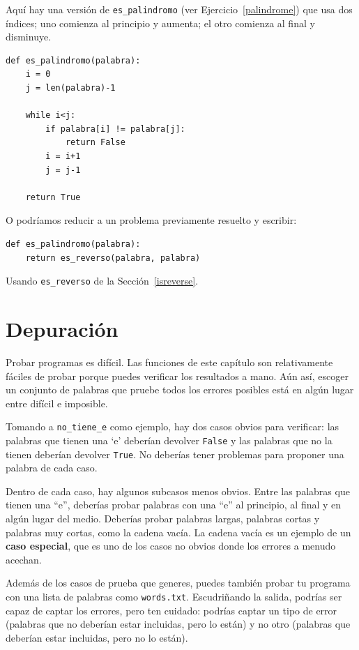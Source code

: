 \documentclass[10pt]{book}
\begin{document}
Aquí hay una versión de \verb"es_palindromo" (ver
Ejercicio~\ref{palindrome}) que usa dos índices; uno comienza al
principio y aumenta; el otro comienza al final y disminuye.

\begin{verbatim}
def es_palindromo(palabra):
    i = 0
    j = len(palabra)-1

    while i<j:
        if palabra[i] != palabra[j]:
            return False
        i = i+1
        j = j-1

    return True
\end{verbatim}

O podríamos reducir a un problema previamente
resuelto y escribir:

\begin{verbatim}
def es_palindromo(palabra):
    return es_reverso(palabra, palabra)
\end{verbatim}
%
Usando \verb"es_reverso" de la Sección~\ref{isreverse}.


\section{Depuración}

Probar programas es difícil.  Las funciones de este capítulo son
relativamente fáciles de probar porque puedes verificar los resultados a mano.
Aún así, escoger un conjunto de palabras que pruebe todos los errores posibles
está en algún lugar entre difícil e imposible.

Tomando a \verb"no_tiene_e" como ejemplo, hay dos casos obvios
para verificar: las palabras que tienen una `e' deberían devolver {\tt False} y
las palabras que no la tienen deberían devolver {\tt True}.  No deberías
tener problemas para proponer una palabra de cada caso.

Dentro de cada caso, hay algunos subcasos menos obvios.  Entre las
palabras que tienen una ``e'', deberías probar palabras con una ``e'' al
principio, al final y en algún lugar del medio.  Deberías probar palabras
largas, palabras cortas y palabras muy cortas, como la cadena vacía.  La
cadena vacía es un ejemplo de un {\bf caso especial}, que es uno de
los casos no obvios donde los errores a menudo acechan.

Además de los casos de prueba que generes, puedes también probar
tu programa con una lista de palabras como {\tt words.txt}.  Escudriñando
la salida, podrías ser capaz de captar los errores, pero ten cuidado:
podrías captar un tipo de error (palabras que no deberían estar
incluidas, pero lo están) y no otro (palabras que deberían estar incluidas,
pero no lo están).
\end{document}
